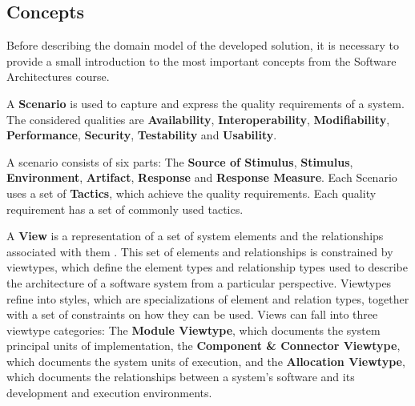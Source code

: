 \documentclass{llncs}
\begin{document}
\subsection{Concepts}
\label{domainModel:SAConcepts}
Before describing the domain model of the developed solution, it is necessary to provide a small introduction to the most important concepts from the Software Architectures course.

A \textbf{Scenario} is used to capture and express the quality requirements of a system. The considered qualities are \textbf{Availability}, \textbf{Interoperability}, \textbf{Modifiability}, \textbf{Performance}, \textbf{Security}, \textbf{Testability} and \textbf{Usability}.

A scenario consists of six parts\cite{bass2003software}: The \textbf{Source of Stimulus}, \textbf{Stimulus}, \textbf{Environment}, \textbf{Artifact}, \textbf{Response} and \textbf{Response Measure}. Each Scenario uses a set of \textbf{Tactics}, which achieve the quality requirements. Each quality requirement has a set of commonly used tactics.

A \textbf{View} is a representation of a set of system elements and the relationships associated with them \cite{clements2003documenting}. This set of elements and relationships is constrained by viewtypes, which define the element types and relationship types used to describe the architecture of a software system from a particular perspective. Viewtypes refine into styles, which are specializations of element and relation types, together with a set of constraints on how they can be used. Views can fall into three viewtype categories: The \textbf{Module Viewtype}, which documents the system principal units of implementation, the \textbf{Component \& Connector Viewtype}, which documents the system units of execution, and the \textbf{Allocation Viewtype}, which documents the relationships between a system's software and its development and execution environments. 
\end{document}
